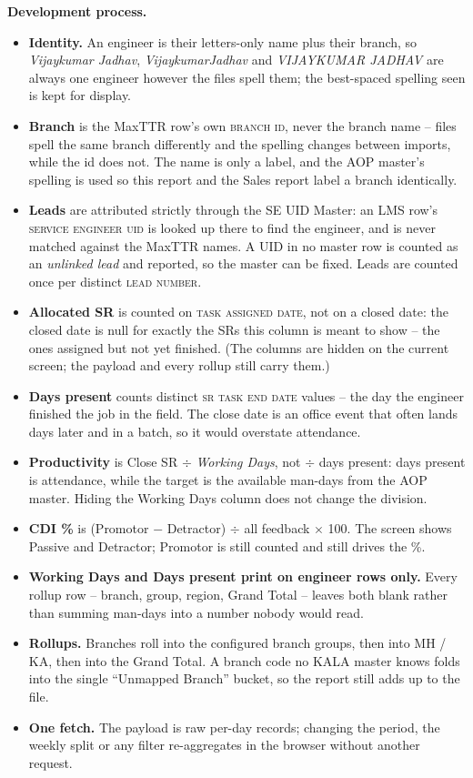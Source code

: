 \documentclass[11pt,a4paper]{article}
\newcommand{\devproc}{\textbf{Development process.}\par}
\newcommand{\qt}[1]{\textquotedblleft #1\textquotedblright}
\newcommand{\col}[1]{\textsc{\small #1}}
\begin{document}
\devproc
\begin{itemize}
  \item \textbf{Identity.} An engineer is their letters-only name plus their branch, so
  \emph{Vijaykumar Jadhav}, \emph{VijaykumarJadhav} and \emph{VIJAYKUMAR  JADHAV} are
  always one engineer however the files spell them; the best-spaced spelling seen is kept
  for display.
  \item \textbf{Branch} is the MaxTTR row's own \col{branch id}, never the branch name --
  files spell the same branch differently and the spelling changes between imports, while
  the id does not. The name is only a label, and the AOP master's spelling is used so this
  report and the Sales report label a branch identically.
  \item \textbf{Leads} are attributed strictly through the SE UID Master: an LMS row's
  \col{service engineer uid} is looked up there to find the engineer, and is never matched
  against the MaxTTR names. A UID in no master row is counted as an \emph{unlinked lead}
  and reported, so the master can be fixed. Leads are counted once per distinct
  \col{lead number}.
  \item \textbf{Allocated SR} is counted on \col{task assigned date}, not on a closed
  date: the closed date is null for exactly the SRs this column is meant to show -- the
  ones assigned but not yet finished. (The columns are hidden on the current screen; the
  payload and every rollup still carry them.)
  \item \textbf{Days present} counts distinct \col{sr task end date} values -- the day the
  engineer finished the job in the field. The close date is an office event that often
  lands days later and in a batch, so it would overstate attendance.
  \item \textbf{Productivity} is Close SR $\div$ \emph{Working Days}, not $\div$ days
  present: days present is attendance, while the target is the available man-days from the
  AOP master. Hiding the Working Days column does not change the division.
  \item \textbf{CDI \%} is (Promotor $-$ Detractor) $\div$ all feedback $\times$ 100. The
  screen shows Passive and Detractor; Promotor is still counted and still drives the \%.
  \item \textbf{Working Days and Days present print on engineer rows only.} Every rollup
  row -- branch, group, region, Grand Total -- leaves both blank rather than summing
  man-days into a number nobody would read.
  \item \textbf{Rollups.} Branches roll into the configured branch groups, then into MH /
  KA, then into the Grand Total. A branch code no KALA master knows folds into the single
  \qt{Unmapped Branch} bucket, so the report still adds up to the file.
  \item \textbf{One fetch.} The payload is raw per-day records; changing the period, the
  weekly split or any filter re-aggregates in the browser without another request.
\end{itemize}
\end{document}
